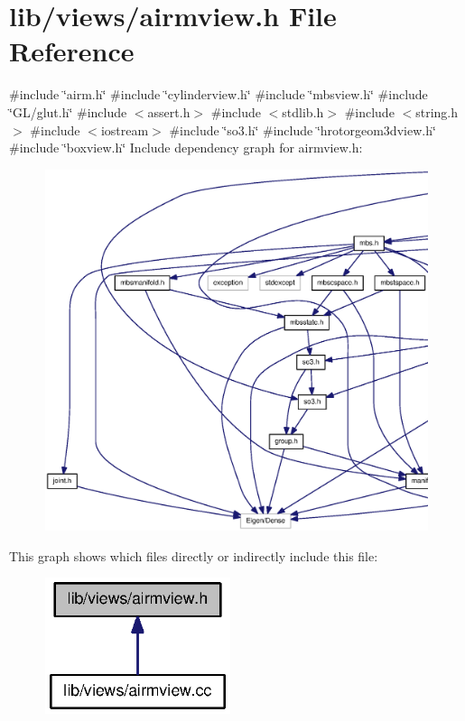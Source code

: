 \section{lib/views/airmview.h \-File \-Reference}
\label{airmview_8h}
{\ttfamily \#include \char`\"{}airm.\-h\char`\"{}}\*
{\ttfamily \#include \char`\"{}cylinderview.\-h\char`\"{}}\*
{\ttfamily \#include \char`\"{}mbsview.\-h\char`\"{}}\*
{\ttfamily \#include \char`\"{}\-G\-L/glut.\-h\char`\"{}}\*
{\ttfamily \#include $<$assert.\-h$>$}\*
{\ttfamily \#include $<$stdlib.\-h$>$}\*
{\ttfamily \#include $<$string.\-h$>$}\*
{\ttfamily \#include $<$iostream$>$}\*
{\ttfamily \#include \char`\"{}so3.\-h\char`\"{}}\*
{\ttfamily \#include \char`\"{}hrotorgeom3dview.\-h\char`\"{}}\*
{\ttfamily \#include \char`\"{}boxview.\-h\char`\"{}}\*
\-Include dependency graph for airmview.\-h\-:\nopagebreak
\begin{figure}[H]
\begin{center}
\leavevmode
\includegraphics[width=350pt]{airmview_8h__incl}
\end{center}
\end{figure}
\-This graph shows which files directly or indirectly include this file\-:\nopagebreak
\begin{figure}[H]
\begin{center}
\leavevmode
\includegraphics[width=154pt]{airmview_8h__dep__incl}
\end{center}
\end{figure}
